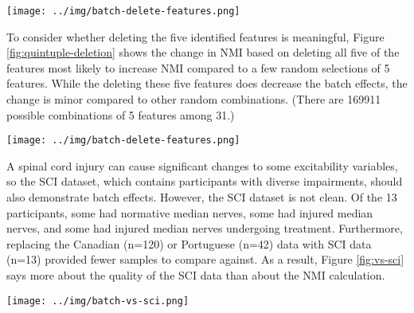 \documentclass[12pt]{article}
\begin{document}
\begin{figure*}[ht]
  \centering
       \texttt{[image: ../img/batch-delete-features.png]}
         \caption{}
  \label{fig:triple-deletion}
\end{figure*}


To consider whether deleting the five identified features is meaningful, Figure \ref{fig:quintuple-deletion} shows the change in NMI based on deleting all five of the features most likely to increase NMI compared to a few random selections of 5 features. While the deleting these five features does decrease the batch effects, the change is minor compared to other random combinations. (There are 169911 possible combinations of 5 features among 31.)

\begin{figure*}[ht]
  \centering
       \texttt{[image: ../img/batch-delete-features.png]}
         \caption{}
  \label{fig:quintuple-deletion}
\end{figure*}

A spinal cord injury can cause significant changes to some excitability variables, so the SCI dataset, which contains participants with diverse impairments, should also demonstrate batch effects. However, the SCI dataset is not clean. Of the 13 participants, some had normative median nerves, some had injured median nerves, and some had injured median nerves undergoing treatment. Furthermore, replacing the Canadian (n=120) or Portuguese (n=42) data with SCI data (n=13) provided fewer samples to compare against. As a result, Figure \ref{fig:vs-sci} says more about the quality of the SCI data than about the NMI calculation.

\begin{figure*}[ht]
  \centering
       \texttt{[image: ../img/batch-vs-sci.png]}
         \caption{}
  \label{fig:vs-sci}
\end{figure*}
\end{document}
